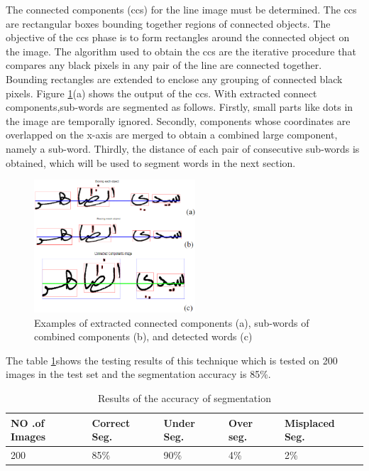 \begin{itemize}[labelindent=1em,labelsep=0.25cm,leftmargin=*]
The connected components (\acrshort{cc}s) for the line image must be determined.  The  \acrshort{cc}s  are  rectangular  boxes  bounding  together  regions of connected objects. The objective of the \acrshort{cc}s phase is to  form  rectangles  around  the  connected object on the image. The algorithm used to obtain the \acrshort{cc}s  are  the  iterative procedure that compares any black pixels in any pair of the line are connected together. Bounding rectangles are  extended to enclose any grouping  of connected black pixels. Figure \ref{fig:ccs}(a) shows the output of the \acrshort{cc}s. With extracted connect components,sub-words are segmented as follows. Firstly, small parts like dots in the image  are  temporally  ignored. Secondly, components whose coordinates are overlapped on the x-axis are merged to obtain a combined large  component, namely a sub-word. Thirdly, the distance of each pair of consecutive sub-words is obtained, which will be used to segment words in the next section.
\begin{figure}[!htb]
    \centering
    \includegraphics[width=6cm]{images/ccs.png}
    \caption{Examples of extracted connected components (a), sub-words of combined components (b), and detected words (c)}
    \label{fig:ccs}
\end{figure}




\end{itemize}

\noindent
The table \ref{tb:vpp-accuracy-table}shows the testing results of this technique which is tested on 200 images in the test set and the segmentation accuracy is  85\%.
    

\begin{table}[!htb]
\centering
\begin{tabular}{|l|l|l|l|l|}
\hline
 NO .of Images & Correct Seg. & Under Seg. & Over seg. & Misplaced Seg. \\ \hline
 200  & 85\%  & 90\% & 4\% & 2\% \\ \hline
\end{tabular}
\caption{Results of the accuracy of segmentation}
\label{tb:vpp-accuracy-table}
\end{table}

